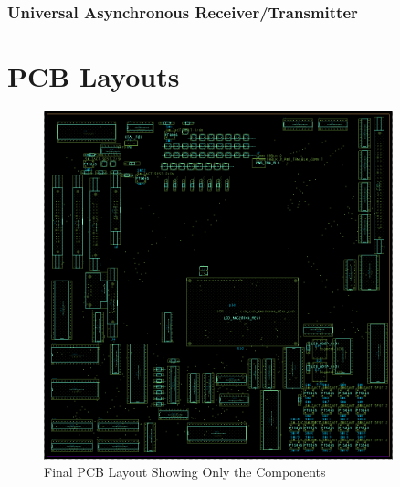 \begin{appendices}
            \subsubsection{Universal Asynchronous Receiver/Transmitter} \label{sec:uart_asm}


        \clearpage
        \newpage

    \section{PCB Layouts} \label{appendix:pcb}

        \begin{figure}[ht]
            \begin{center}
                \includegraphics[width=0.9\textwidth]{figures/main.png}
                \caption{Final PCB Layout Showing Only the Components} \label{fig:main}
            \end{center}
        \end{figure}


\end{appendices}
